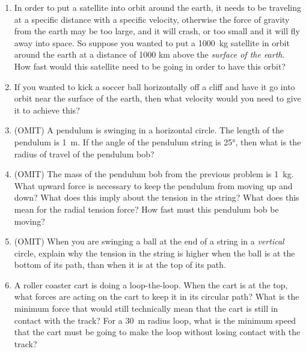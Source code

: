 \begin{enumerate}
	\item In order to put a satellite into orbit around the earth, it needs to be traveling at a specific distance with a specific velocity, otherwise the force of gravity from the earth may be too large, and it will crash, or too small and it will fly away into space. So suppose you wanted to put a \SI{1000}{kg} satellite in orbit around the earth at a distance of 1000 km above the \emph{surface of the earth}. How fast would this satellite need to be going in order to have this orbit?
	
	\item If you wanted to kick a soccer ball horizontally off a cliff and have it go into orbit near the surface of the earth, then what velocity would you need to give it to achieve this?
	
	\item (OMIT) A pendulum is swinging in a horizontal circle. The length of the pendulum is \SI{1}{m}. If the angle of the pendulum string is \ang{25}, then what is the radius of travel of the pendulum bob?
	
	\item (OMIT) The mass of the pendulum bob from the previous problem is \SI{1}{kg}. What upward force is necessary to keep the pendulum from moving up and down? What does this imply about the tension in the string? What does this mean for the radial tension force? How fast must this pendulum bob be moving?
	
	\item (OMIT) When you are swinging a ball at the end of a string in a \emph{vertical} circle, explain why the tension in the string is higher when the ball is at the bottom of its path, than when it is at the top of its path.
	
	\item A roller coaster cart is doing a loop-the-loop. When the cart is at the top, what forces are acting on the cart to keep it in its circular path? What is the minimum force that would still technically mean that the cart is still in contact with the track? For a \SI{30}{m} radius loop, what is the minimum speed that the cart must be going to make the loop without losing contact with the track?   
	
\end{enumerate}